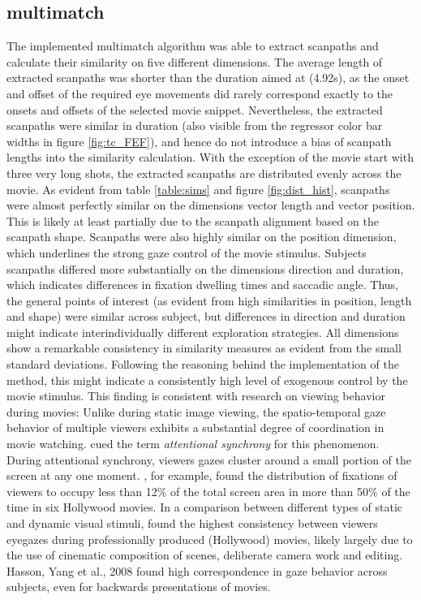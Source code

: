 \documentclass[a4paper, 12pt]{scrreprt}
\begin{document}
\subsection{multimatch}
The implemented multimatch algorithm was able to extract scanpaths and calculate their similarity on five different dimensions. The average length of extracted scanpaths was shorter than the duration aimed at (4.92s), as the onset and offset of the required eye movements did rarely correspond exactly to the onsets and offsets of the selected movie snippet. Nevertheless, the extracted scanpaths were similar in duration (also visible from the regressor color bar widths in figure \ref{fig:tc_FEF}), and hence do not introduce a bias of scanpath lengths into the similarity calculation. With the exception of the movie start with three very long shots, the extracted scanpaths are distributed evenly across the movie. As evident from table \ref{table:sims} and figure \ref{fig:dist_hist}, scanpaths were almost perfectly similar on the dimensions vector length and vector position. This is likely at least partially due to the scanpath alignment based on the scanpath shape. Scanpaths were also highly similar on the position dimension, which underlines the strong gaze control of the movie stimulus. Subjects scanpaths differed more substantially on the dimensions direction and duration, which indicates differences in fixation dwelling times and saccadic angle. Thus, the general points of interest (as evident from high similarities in position, length and shape) were similar across subject, but differences in direction and duration might indicate interindividually different exploration strategies. All dimensions show a remarkable consistency in similarity measures as evident from the small standard deviations. Following the reasoning behind the implementation of the method, this might indicate a consistently high level of exogenous control by the movie stimulus. This finding is consistent with research on viewing behavior during movies: Unlike during static image viewing, the spatio-temporal gaze behavior of multiple viewers exhibits a substantial degree of coordination in movie watching. \textcite{smith2008attentional} cued the term \textit{attentional synchrony} for this phenomenon. During attentional synchrony, viewers gazes cluster around a small portion of the screen at any one moment. \textcite{goldstein2007people}, for example, found the distribution of fixations of viewers to occupy less than 12\% of the total screen area in more than 50\% of the time in six Hollywood movies. In a comparison between different types of static and dynamic visual stimuli, \textcite{dorr2010variability} found the highest consistency between viewers eyegazes during professionally produced (Hollywood) movies, likely largely due to the use of cinematic composition of scenes, deliberate camera work and editing. Hasson, Yang et al., 2008 found high correspondence in gaze behavior across subjects, even for backwards presentations of movies. \newline
\end{document}
